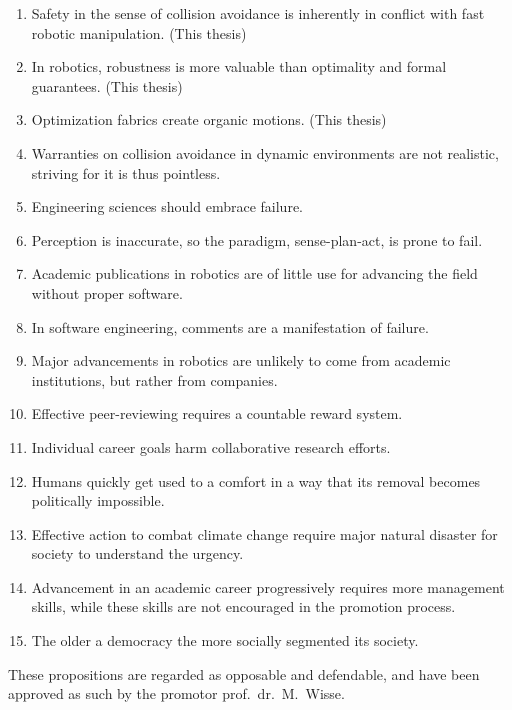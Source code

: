 \documentclass[nativefonts]{TUD-dissertation2020}
\begin{document}
\begin{enumerate}

  \item Safety in the sense of collision avoidance is inherently in conflict
    with fast robotic manipulation. (This thesis)
  \item In robotics, robustness is more valuable than optimality and formal
    guarantees. (This thesis)
  \item Optimization fabrics create organic motions. (This thesis)
  \item Warranties on collision avoidance in dynamic environments are not
    realistic, striving for it is thus pointless.
  \item Engineering sciences should embrace failure.
  \item Perception is inaccurate, so the paradigm, sense-plan-act, is prone to
    fail.
  \item Academic publications in robotics are of little use for advancing the
    field without proper software.
  \item In software engineering, comments are a manifestation of failure.
  \item Major advancements in robotics are unlikely to come from academic
    institutions, but rather from companies.
  \item Effective peer-reviewing requires a countable reward system.
  \item Individual career goals harm collaborative research efforts.
  \item Humans quickly get used to a comfort in a way that its removal becomes
    politically impossible.
  \item Effective action to combat climate change require major natural disaster
    for society to understand the urgency.
  \item Advancement in an academic career progressively requires more management
    skills, while these skills are not encouraged in the promotion process.
  \item The older a democracy the more socially segmented its society.
\end{enumerate}

\bigskip
\bigskip

\begin{center}
These propositions are regarded as opposable and defendable, and have been
  approved as such by the promotor prof.\ dr.\ M.\ Wisse.
\end{center}
\end{document}
